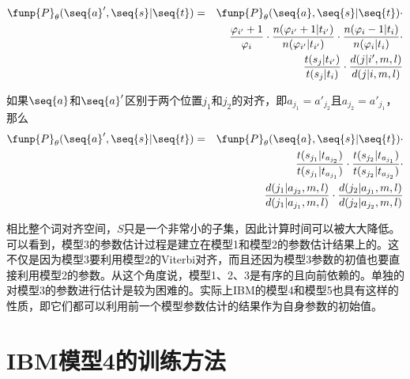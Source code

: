 \begin{appendices}
\begin{eqnarray}
\funp{P}_{\theta}(\seq{a}',\seq{s}|\seq{t}) & = & \funp{P}_{\theta}(\seq{a},\seq{s}|\seq{t}) \cdot  \nonumber \\
                                                                                   &     & \frac{\varphi_{i'}+1}{\varphi_i} \cdot \frac{n(\varphi_{i'}+1|t_{i'})}{n(\varphi_{i'}|t_{i'})} \cdot \frac{n(\varphi_{i}-1|t_{i})}{n(\varphi_{i}|t_{i})} \cdot \nonumber \\
                                                                                   &     & \frac{t(s_j|t_{i'})}{t(s_{j}|t_{i})} \cdot \frac{d(j|i',m,l)}{d(j|i,m,l)}
\label{eq:1.13}
\end{eqnarray}

\parinterval 如果$\seq{a}$和$\seq{a}'$区别于两个位置$j_1$和$j_2$的对齐，即$a_{j_{1}}=a'_{j_{2}}$且$a_{j_{2}}=a'_{j_{1}}$，那么
\begin{eqnarray}
\funp{P}_{\theta}(\seq{a}',\seq{s}|\seq{t}) &=& \funp{P}_{\theta}(\seq{a},\seq{s}|\seq{t}) \cdot \nonumber \\
                                                                 &  & \frac{t(s_{j_{1}}|t_{a_{j_{2}}})}{t(s_{j_{1}}|t_{a_{j_{1}}})} \cdot \frac{t(s_{j_{2}}|t_{a_{j_{1}}})}{t(s_{j_{2}}|t_{a_{j_{2}}})} \cdot \nonumber \\
                                                                 &  & \frac{d(j_{1}|a_{j_{2}},m,l)}{d(j_{1}|a_{j_{1}},m,l)} \cdot \frac{d(j_{2}|a_{j_{1}},m,l)}{d(j_{2}|a_{j_{2}},m,l)}
\label{eq:1.14}
\end{eqnarray}

\parinterval 相比整个词对齐空间，$S$只是一个非常小的子集，因此计算时间可以被大大降低。可以看到，模型3的参数估计过程是建立在模型1和模型2的参数估计结果上的。这不仅是因为模型3要利用模型2的Viterbi对齐，而且还因为模型3参数的初值也要直接利用模型2的参数。从这个角度说，模型1、2、3是有序的且向前依赖的。单独的对模型3的参数进行估计是较为困难的。实际上IBM的模型4和模型5也具有这样的性质，即它们都可以利用前一个模型参数估计的结果作为自身参数的初始值。


\section{IBM模型4的训练方法}


\end{appendices}
